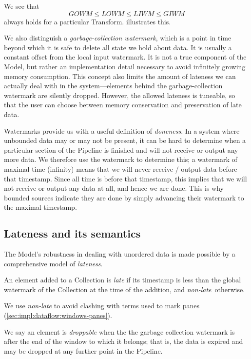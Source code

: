 We see that \[ \mathit{GOWM} \leq \mathit{LOWM} \leq \mathit{LIWM} \leq \mathit{GIWM} \] always holds for a particular Transform.  illustrates this.

We also distinguish a \emph{garbage-collection watermark}, which is a point in time beyond which it is safe to delete all state we hold about data.
It is usually a constant offset from the local input watermark.
It is not a true component of the Model, but rather an implementation detail necessary to avoid infinitely growing memory consumption.
This concept also limits the amount of lateness we can actually deal with in the system---elements behind the garbage-collection watermark are silently dropped.
However, the allowed lateness is tuneable, so that the user can choose between memory conservation and preservation of late data.

Watermarks provide us with a useful definition of \emph{doneness}.
In a system where unbounded data may or may not be present, it can be hard to determine when a particular section of the Pipeline is finished and will not receive or output any more data.
We therefore use the watermark to determine this; a watermark of maximal time (infinity) means that we will never receive / output data before that timestamp.
Since all time is before that timestamp, this implies that we will not receive or output any data at all, and hence we are done.
This is why bounded sources indicate they are done by simply advancing their watermark to the maximal timestamp.

\subsection{Lateness and its semantics}\label{sec:impl:dataflow:lateness}

The Model's robustness in dealing with unordered data is made possible by a comprehensive model of \emph{lateness}.

An element added to a Collection is \emph{late} if its timestamp is less than the global watermark of the Collection at the time of the addition, and \emph{non-late}\footnotemark\ otherwise.

\footnotetext
{
We use \emph{non-late} to avoid clashing with terms used to mark panes (\cref{sec:impl:dataflow:windows-panes}).
}

We say an element is \emph{droppable} when the the garbage collection watermark is after the end of the window to which it belongs; that is, the data is expired and may be dropped at any further point in the Pipeline.

